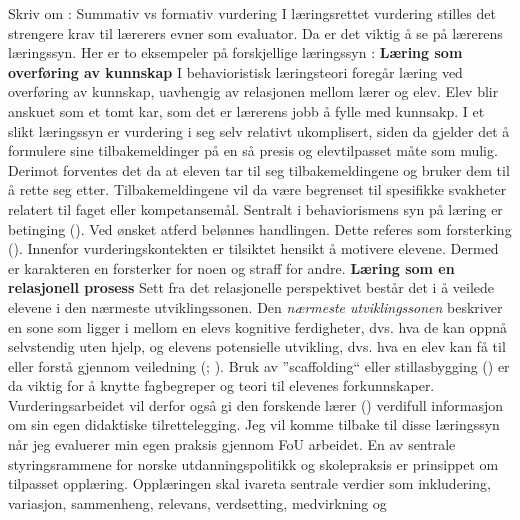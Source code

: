 \documentclass[main.tex]{subfiles}
\begin{document}
Skriv om : Summativ vs formativ vurdering
\newline
\newline
I læringsrettet vurdering stilles det strengere krav til lærerers evner som evaluator. Da er det viktig å se på lærerens læringssyn. 
Her er to eksempeler på forskjellige læringssyn :
\newline
\newline
\textbf{Læring som overføring av kunnskap}
\newline
I behavioristisk læringsteori foregår læring ved overføring av kunnskap, uavhengig av relasjonen mellom lærer 
og elev. Elev blir anskuet som et tomt kar, som det er lærerens jobb å fylle med kunnsakp. 
I et slikt læringssyn er vurdering i seg selv relativt ukomplisert, siden da gjelder det å 
formulere sine tilbakemeldinger på en så presis og elevtilpasset måte som mulig.
Derimot forventes det da at eleven tar til seg tilbakemeldingene og bruker dem til å rette seg etter.
Tilbakemeldingene vil da være begrenset til spesifikke svakheter relatert til faget eller kompetansemål.
Sentralt i behaviorismens syn på læring er betinging (). Ved ønsket atferd belønnes 
handlingen. Dette referes som forsterking (). Innenfor vurderingskontekten er
tilsiktet hensikt å motivere elevene. Dermed er karakteren en forsterker for noen og straff for andre.
\newline
\newline
\textbf{Læring som en relasjonell prosess}
\newline
Sett fra det relasjonelle perspektivet består det i å veilede elevene i den nærmeste utviklingssonen.
Den \emph{nærmeste utviklingssonen} beskriver en sone som ligger i mellom en elevs kognitive 
ferdigheter, dvs. hva de kan oppnå selvstendig uten hjelp, og elevens potensielle utvikling, dvs. 
hva en elev kan få til eller forstå gjennom veiledning (; ). 
Bruk av ''scaffolding`` eller stillasbygging () er da viktig for å knytte fagbegreper og teori til elevenes 
forkunnskaper. Vurderingsarbeidet vil derfor også gi den forskende lærer () verdifull informasjon 
om sin egen didaktiske tilrettelegging.
Jeg vil komme tilbake til disse læringssyn når jeg evaluerer min egen praksis gjennom FoU arbeidet.
\newline
\newline
En av sentrale styringsrammene for norske utdanningspolitikk og skolepraksis er prinsippet om tilpasset opplæring.
Opplæringen skal ivareta sentrale verdier som inkludering, variasjon, sammenheng, relevans, verdsetting, medvirkning og 
\end{document}

